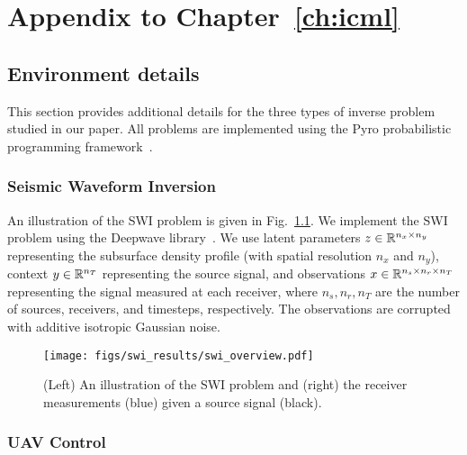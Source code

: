 \chapter{Appendix to Chapter~\ref{ch:icml}}

\section{Environment details}

This section provides additional details for the three types of inverse problem studied in our paper. All problems are implemented using the Pyro probabilistic programming framework~\cite{binghamPyroDeepUniversal2019}.

\subsection{Seismic Waveform Inversion}

An illustration of the SWI problem is given in Fig.~\ref{fig:swi_explainer}. We implement the SWI problem using the Deepwave library~\cite{richardsonDeepwave2023}. We use latent parameters $z \in \mathbb{R}^{n_x \times n_y}$ representing the subsurface density profile (with spatial resolution $n_x$ and $n_y$), context $y \in \mathbb{R}^{n_T}$ representing the source signal, and observations $x \in \mathbb{R}^{n_{s} \times n_{r} \times n_{T}}$ representing the signal measured at each receiver, where $n_s, n_r, n_T$ are the number of sources, receivers, and timesteps, respectively. The observations are corrupted with additive isotropic Gaussian noise.

\begin{figure}[ht]
    \centering
    \texttt{[image: figs/swi\_results/swi\_overview.pdf]}
    \caption{(Left) An illustration of the SWI problem and (right) the receiver measurements (blue) given a source signal (black).}
    \label{fig:swi_explainer}
\end{figure}

\subsection{UAV Control}

